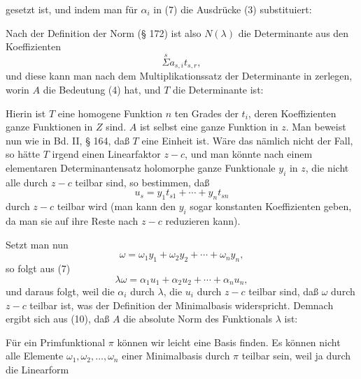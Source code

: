 gesetzt ist, und indem man für $\alpha_i$ in (7) die Ausdrücke (3) substituiert:

Nach der Definition der Norm (§ 172) ist also $N(\lambda)$ die
Determinante aus den Koeffizienten
\[
\overset{s}{\Sigma} a_{s,i} t_{s,r},
\]
und diese kann man nach dem Multiplikationssatz der Determinante
 in
zerlegen, worin $A$ die Bedeutung (4) hat, und $T$ die Determinante ist:

Hierin ist $T$ eine homogene Funktion $n$ ten Grades der $t_i$,
deren Koeffizienten ganze Funktionen in $Z$ sind. $A$ ist selbst
eine ganze Funktion in $z$. Man beweist nun wie in Bd. II, § 164,
daß $T$ eine Einheit ist. Wäre das nämlich nicht der Fall, so
hätte $T$ irgend einen Linearfaktor $z - c$, und man könnte
nach einem elementaren Determinantensatz holomorphe ganze
Funktionale $y_i$ in $z$, die nicht alle durch $z - c$ teilbar sind, so
bestimmen, daß
\[
u_s = y_1 t_{s1} + \cdots + y_n t_{sn}
\]
durch $z - c$ teilbar wird (man kann den $y_i$ sogar konstanten
Koeffizienten geben, da man sie auf ihre Reste nach $z - c$ reduzieren
 kann).

Setzt man nun
\[
\omega = \omega_1 y_1 + \omega_2 y_2 + \cdots + \omega_n y_n,
\]
so folgt aus (7)
\[
\lambda \omega = \alpha_1 u_1 + \alpha_2 u_2 + \cdots + \alpha_n u_n,
\]
und daraus folgt, weil die $\alpha_i$ durch $\lambda$, die $u_i$ durch $z - c$ teilbar
sind, daß $\omega$ durch $z - c$ teilbar ist, was der Definition der
Minimalbasis widerspricht. Demnach ergibt sich aus (10), daß $A$
die absolute Norm des Funktionals $\lambda$ ist:

Für ein Primfunktional $\pi$ können wir leicht eine Basis finden.
Es können nicht alle Elemente $\omega_1, \omega_2, \ldots, \omega_n$ einer Minimalbasis
durch $\pi$ teilbar sein, weil ja durch die Linearform
